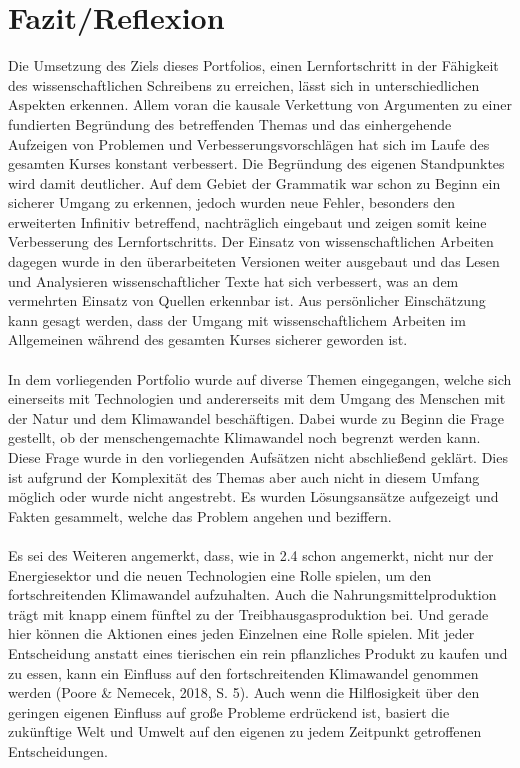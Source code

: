 \chapter{Fazit/Reflexion}
Die Umsetzung des Ziels dieses Portfolios, einen Lernfortschritt in der Fähigkeit des wissenschaftlichen Schreibens zu erreichen, lässt sich in unterschiedlichen Aspekten erkennen. Allem voran die kausale Verkettung von Argumenten zu einer fundierten Begründung des betreffenden Themas und das einhergehende Aufzeigen von Problemen und Verbesserungsvorschlägen hat sich im Laufe des gesamten Kurses konstant verbessert. Die Begründung des eigenen Standpunktes wird damit deutlicher. Auf dem Gebiet der Grammatik war schon zu Beginn ein sicherer Umgang zu erkennen, jedoch wurden neue Fehler, besonders den erweiterten Infinitiv betreffend, nachträglich eingebaut und zeigen somit keine Verbesserung des Lernfortschritts. Der Einsatz von wissenschaftlichen Arbeiten dagegen wurde in den überarbeiteten Versionen weiter ausgebaut und das Lesen und Analysieren wissenschaftlicher Texte hat sich verbessert, was an dem vermehrten Einsatz von Quellen erkennbar ist. Aus persönlicher Einschätzung kann gesagt werden, dass der Umgang mit wissenschaftlichem Arbeiten im Allgemeinen während des gesamten Kurses sicherer geworden ist.\\\\
In dem vorliegenden Portfolio wurde auf diverse Themen eingegangen, welche sich einerseits mit Technologien und andererseits mit dem Umgang des Menschen mit der Natur und dem Klimawandel beschäftigen. Dabei wurde zu Beginn die Frage gestellt, ob der menschengemachte Klimawandel noch begrenzt werden kann. Diese Frage wurde in den vorliegenden Aufsätzen nicht abschließend geklärt. Dies ist aufgrund der Komplexität des Themas aber auch nicht in diesem Umfang möglich oder wurde nicht angestrebt. Es wurden Lösungsansätze aufgezeigt und Fakten gesammelt, welche das Problem angehen und beziffern.\\\\
Es sei des Weiteren angemerkt, dass, wie in 2.4 schon angemerkt, nicht nur der Energiesektor und die neuen Technologien eine Rolle spielen, um den fortschreitenden Klimawandel aufzuhalten. Auch die Nahrungsmittelproduktion trägt mit knapp einem fünftel zu der Treibhausgasproduktion bei. Und gerade hier können die Aktionen eines jeden Einzelnen eine Rolle spielen. Mit jeder Entscheidung anstatt eines tierischen ein rein pflanzliches Produkt zu kaufen und zu essen, kann ein Einfluss auf den fortschreitenden Klimawandel genommen werden (Poore \& Nemecek, 2018, S. 5).  Auch wenn die Hilflosigkeit über den geringen eigenen Einfluss auf große Probleme erdrückend ist, basiert die zukünftige Welt und Umwelt auf den eigenen zu jedem Zeitpunkt getroffenen Entscheidungen.

